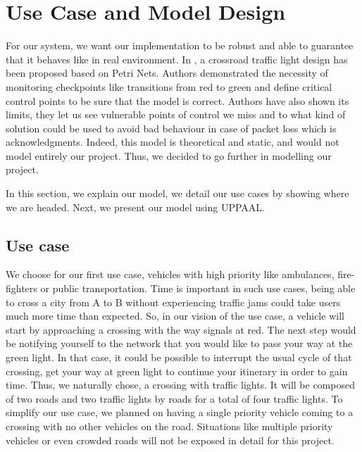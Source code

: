 \section{Use Case and Model Design} \label{sec:Use Case and Model Design}

For our system,
we want our implementation to be robust and able to guarantee that it behaves like in real environment.
In \cite{huang_modular_2014},
	a crossroad traffic light design has been proposed based on Petri Nets.
Authors demonstrated the necessity of monitoring checkpoints like transitions from red to green and define critical control points to be sure that the model is correct.
Authors have also shown its limits,
	they let us see vulnerable points of control we miss and to what kind of solution could be used to avoid bad behaviour in case of packet loss which is acknowledgments.
Indeed,
	this model is theoretical and static,
	and would not model entirely our project.
Thus,
	we decided to go further in modelling our project.

In this section,
	we explain our model,
	we detail our use cases by showing where we are headed.
Next,
	we present our model using UPPAAL.


\subsection{Use case}

We choose for our first use case,
vehicles with high priority like ambulances,
	fire-fighters or public transportation.
Time is important in such use cases,
	being able to cross a city from A to B without experiencing traffic jams could take users much more time than expected.
So,
	in our vision of the use case,
	a vehicle will start by approaching a crossing with the way signals at red.
The next step would be notifying yourself to the network that you would like to pass your way at the green light.
In that case,
	it could be possible to interrupt the usual cycle of that crossing,
	get your way at green light to continue your itinerary in order to gain time.
Thus,
	we naturally chose,
	a crossing with traffic lights.
It will be composed of two roads and two traffic lights by roads for a total of four traffic lights.
To simplify our use case,
	we planned on having a single priority vehicle coming to a crossing with no other vehicles on the road.
Situations like multiple priority vehicles or even crowded roads will not be exposed in detail for this project.

